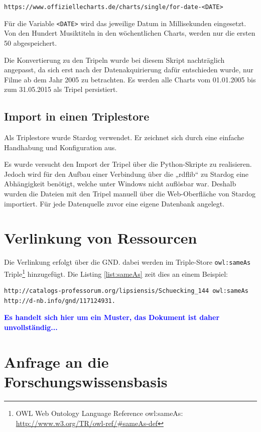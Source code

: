 \documentclass[parskip]{scrartcl}
\begin{document}
\texttt{https://www.offiziellecharts.de/charts/single/for-date-<DATE>}

Für die Variable \texttt{<DATE>} wird das jeweilige Datum in Millisekunden eingesetzt. Von den Hundert Musiktiteln in den wöchentlichen Charts, werden nur die ersten 50 abgespeichert.

Die Konvertierung zu den Tripeln wurde bei diesem Skript nachträglich angepasst, da sich erst nach der Datenakquirierung dafür entschieden wurde, nur Filme ab dem Jahr 2005 zu betrachten. Es werden alle Charts vom 01.01.2005 bis zum 31.05.2015 als Tripel persistiert.


\subsection{Import in einen Triplestore}
Als Triplestore wurde Stardog verwendet. Er zeichnet sich durch eine einfache Handhabung und Konfiguration aus.

Es wurde versucht den Import der Tripel über die Python-Skripte zu realisieren. Jedoch wird für den Aufbau einer Verbindung über die „rdflib“ zu Stardog eine Abhängigkeit benötigt, welche unter Windows nicht auflösbar war. Deshalb wurden die Dateien mit den Tripel manuell über die Web-Oberfläche von Stardog importiert. Für jede Datenquelle zuvor eine eigene Datenbank angelegt.


\section{Verlinkung von Ressourcen}

Die Verlinkung erfolgt über die GND. dabei werden im Triple-Store \verb+owl:sameAs+ Triple\footnote{OWL Web Ontology Language
Reference owl:sameAs: \url{http://www.w3.org/TR/owl-ref/#sameAs-def}} hinzugefügt. Die Listing \ref{list:sameAs} zeit dies an einem Beispiel:

\begin{lstlisting}[caption={Beispiel für die Verwendung von owl:sameAS}, label={list:sameAs}]
http://catalogs-professorum.org/lipsiensis/Schuecking_144 owl:sameAs http://d-nb.info/gnd/117124931.
\end{lstlisting}


\textcolor{blue}{\textbf{Es handelt sich hier um ein Muster, das Dokument ist daher unvollständig...}}

\section{Anfrage an die Forschungswissensbasis}
\end{document}
